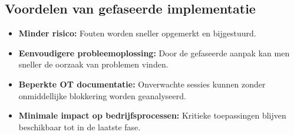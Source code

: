 \subsection*{Voordelen van gefaseerde implementatie}

\begin{itemize}
    \item \textbf{Minder risico:} Fouten worden sneller opgemerkt en bijgestuurd.
    \item \textbf{Eenvoudigere probleemoplossing:} Door de gefaseerde aanpak kan men sneller de oorzaak van problemen vinden.
    \item \textbf{Beperkte OT documentatie:} Onverwachte sessies kunnen zonder onmiddellijke blokkering worden geanalyseerd.
    \item \textbf{Minimale impact op bedrijfsprocessen:} Kritieke toepassingen blijven beschikbaar tot in de laatste fase.
\end{itemize}





